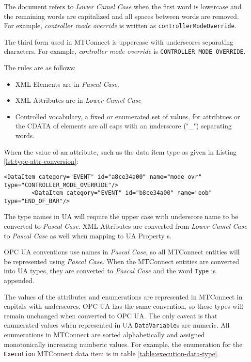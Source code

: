 The document refers to \textit{Lower Camel Case} when the first word is lowercase and the remaining words are capitalized and all spaces between words are removed. For example, \textit{controller mode override} is written as \texttt{controllerModeOverride}.

The third form used in MTConnect is uppercase with underscores separating characters. For example, \textit{controller mode override} is \texttt{CONTROLLER_MODE_OVERRIDE}.

The rules are as follows:
\begin{itemize}
\item XML Elements are in \textit{Pascal Case}.
\item XML Attributes are in \textit{Lower Camel Case}
\item Controlled vocabulary, a fixed or enumerated set of values, for attribtues or the CDATA of elements are all caps with an underscore ("\_") separating words. 
\end{itemize}

When the value of an attribute, such as the data item type as given in Listing \ref{lst:type-attr-conversion}:

\begin{lstlisting}[firstnumber=1,%
    caption={\texttt{DataItem} \texttt{type} Attribtue Conversion}, label={lst:type-attr-conversion}]
        <DataItem category="EVENT" id="a8ce34a00" name="mode_ovr" type="CONTROLLER_MODE_OVERRIDE"/>
        <DataItem category="EVENT" id="b8ce34a00" name="eob" type="END_OF_BAR"/>
\end{lstlisting}

The type names in UA will require the upper case with underscore name to be converted to \textit{Pascal Case}. XML Attributes are converted from \textit{Lower Camel Case} to \textit{Pascal Case} as well when mapping to UA Property s.

OPC UA conventions use names in \textit{Pascal Case}, so all MTConnect entities will be represented using \textit{Pascal Case}. When the MTConnect entities are converted into UA types, they are converted to \textit{Pascal Case} and the word \texttt{Type} is appended. 

The values of the attributes and enumerations are represented in MTConnect in capitals with underscores. OPC UA has the same convention, so these types will remain unchanged when converted to OPC UA. The only caveat is that enumerated values when represented in UA \texttt{DataVariable}s are numeric. All enumerations in MTConnect are sorted alphabetically and assigned monotonically increasing numberic values. For example, the enumeration for the \texttt{Execution} MTConnect data item is in table \ref{table:execution-data-type}.

